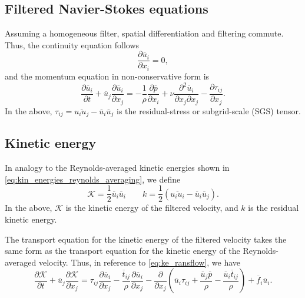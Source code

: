 \documentclass[oneside,a4paper,11pt]{report}
\newcommand{\favg}{\overline{f}}
\newcommand{\pavg}{\overline{p}}
\newcommand{\tavg}{\overline{t}}
\newcommand{\uavg}{\overline{u}}
\newcommand{\rs}{\tau}          %
\newcommand{\ures}{\overline{u}}
\newcommand{\pres}{\overline{p}}
\begin{document}
\subsection{Filtered Navier-Stokes equations}
\label{sec:filtered_incomp_ns}
Assuming a homogeneous filter, spatial differentiation and filtering commute. Thus, the continuity equation follows
\begin{equation}
\frac{\partial \ures_i}{\partial x_i} = 0,
\end{equation}
and the momentum equation in non-conservative form is
\begin{equation}
\frac{\partial \ures_i}{\partial t} + \ures_j \frac{\partial \ures_i}{\partial x_j} = -\frac{1}{\rho} \frac{\partial \pres}{\partial x_i} + \nu \frac{\partial^2 \ures_i}{\partial x_j \partial x_j} - \frac{\partial \rs_{ij}}{\partial x_j}.
\end{equation}
In the above, $\rs_{ij} = \overline{ u_i u_j} - \ures_i \ures_j$ is the residual-stress or subgrid-scale (SGS) tensor.

\subsection{Kinetic energy}
In analogy to the Reynolds-averaged kinetic energies shown in \cref{eq:kin_energies_reynolds_averaging}, we define
\begin{equation}
    \label{eq:kin_energies_reynolds_filtering}
    \mathcal{K} = \frac{1}{2} \ures_i \ures_i \qquad k = \frac{1}{2} \left ( \overline{u_i u_i} - \ures_i \ures_j \right ).
\end{equation}
In the above, $\mathcal{K}$ is the kinetic energy of the filtered velocity, and $k$ is the residual kinetic energy. 

The transport equation for the kinetic energy of the filtered velocity takes the same form as the transport equation for the kinetic energy of the Reynolds-averaged velocity. Thus, in reference to \cref{eq:ke_ransflow}, we have
\begin{equation}
    \frac{\partial \mathcal{K} }{\partial t} + \uavg_j \frac{ \partial \mathcal{K} }{\partial x_j} = \rs_{ij} \frac{\partial \uavg_i}{\partial x_j} - \frac{ \tavg_{ij} }{ \rho } \frac{ \partial \uavg_i }{\partial x_j} -  \frac{\partial}{\partial x_j} \left ( \uavg_i \rs_{ij} + \frac{ \uavg_j \pavg }{\rho} - \frac{ \uavg_i \tavg_{ij} }{\rho} \right ) + \favg_i \uavg_i.
\end{equation}
\end{document}
